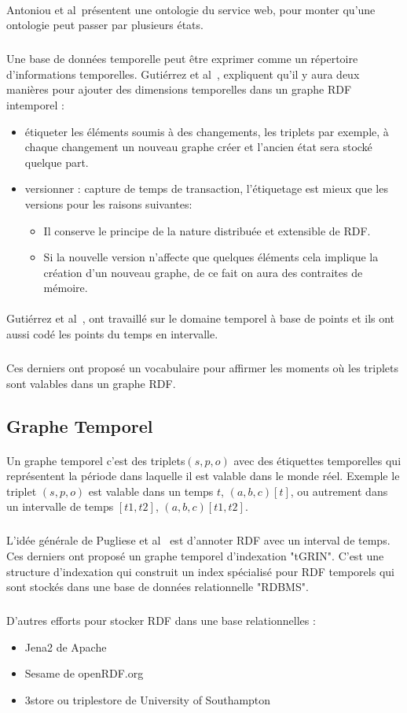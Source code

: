 \paragraph{}
Antoniou et al~\cite{antoniou2004}présentent une ontologie du service web, pour monter qu'une ontologie peut passer par plusieurs états.
\subparagraph{}
Une base de données temporelle peut être exprimer comme un répertoire d'informations temporelles.
Gutiérrez et al~\cite{gutierrez2007}, expliquent qu'il y aura deux manières pour ajouter des dimensions temporelles dans un graphe RDF intemporel :
\begin{itemize}
\item étiqueter les éléments soumis à des changements, les triplets par exemple, à chaque changement un nouveau graphe créer et l’ancien état sera stocké quelque part.
\item versionner : capture de temps de transaction, l’étiquetage est mieux que les versions pour les raisons suivantes: 
 \begin{itemize}
\item Il conserve le principe de la nature distribuée et extensible de RDF.
\item Si la nouvelle version n’affecte que quelques éléments cela implique la création d’un nouveau graphe, de ce fait on aura des contraites de mémoire.
\end{itemize}
\end{itemize}
\paragraph{}
Gutiérrez et al~\cite{gutierrez2007}, ont travaillé sur le domaine temporel à base de points et ils ont aussi codé les points du temps en intervalle.
\subparagraph{}
Ces derniers ont proposé un vocabulaire pour affirmer les moments où les triplets sont valables dans un graphe RDF.
\subsection*{Graphe Temporel}
\paragraph{}
Un graphe temporel c'est des triplets$(s,p,o)$ avec des étiquettes temporelles qui représentent la période dans laquelle il est valable dans le monde réel.
Exemple le triplet $(s,p,o)$ est valable dans un temps $t$, $(a,b,c)[t]$, ou autrement dans un intervalle de temps $[t1,t2]$, $(a,b,c)[t1,t2]$.
\subparagraph{}
L'idée générale de Pugliese et al~\cite{pugliese2008} est d'annoter RDF avec un interval de temps.
Ces derniers ont proposé un graphe temporel d'indexation "tGRIN". C'est une structure d’indexation qui construit un index spécialisé pour RDF temporels qui sont stockés dans une base de données relationnelle "RDBMS".
\subparagraph{}
D’autres efforts pour stocker RDF dans une base relationnelles :
\begin{itemize}
\item Jena2 de Apache
\item Sesame de openRDF.org
\item 3store ou triplestore de University of Southampton
\end{itemize}
